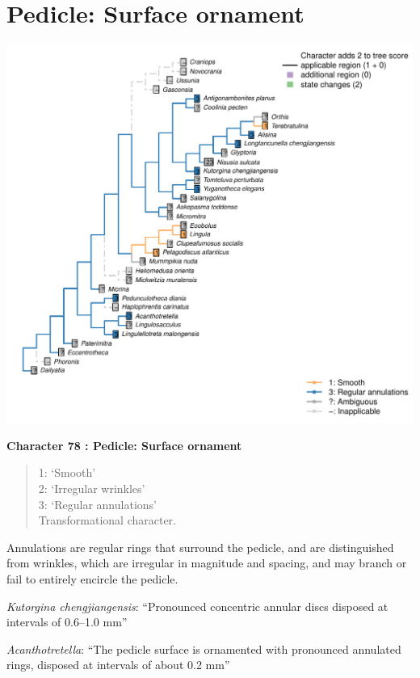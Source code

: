 \documentclass[]{book}
\theoremstyle{definition}
\theoremstyle{definition}
\theoremstyle{definition}
\theoremstyle{remark}
\begin{document}
\hypertarget{pedicle-surface-ornament}{%
\section*{Pedicle: Surface ornament}\label{pedicle-surface-ornament}}

\includegraphics{Brachiopod_phylogeny_files/figure-latex/unnamed-chunk-5-78.pdf}

\textbf{Character 78 : Pedicle: Surface ornament }

\begin{quote}
1: `Smooth'\\
2: `Irregular wrinkles'\\
3: `Regular annulations'\\
Transformational character.
\end{quote}

Annulations are regular rings that surround the pedicle, and are
distinguished from wrinkles, which are irregular in magnitude and
spacing, and may branch or fail to entirely encircle the pedicle.

\emph{Kutorgina chengjiangensis}: ``Pronounced concentric annular discs
disposed at intervals of 0.6--1.0 mm''

\emph{Acanthotretella}: ``The pedicle surface is ornamented with
pronounced annulated rings, disposed at intervals of about 0.2 mm''
\end{document}
